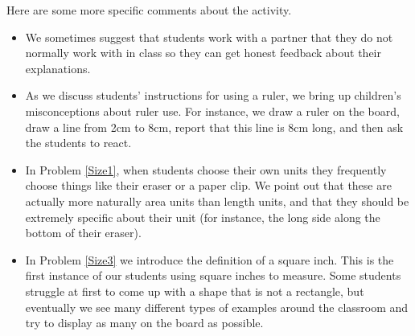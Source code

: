 \documentclass[nooutcomes]{ximera}
\begin{document}
\begin{instructorNotes}
Here are some more specific comments about the activity.
\begin{itemize}
    \item We sometimes suggest that students work with a partner that they do not normally work with in class so they can get honest feedback about their explanations.
    \item As we discuss students' instructions for using a ruler, we bring up children's misconceptions about ruler use.  For instance, we draw a ruler on the board, draw a line from 2cm to 8cm, report that this line is 8cm long, and then ask the students to react.
    \item In Problem \ref{Size1}, when students choose their own units they frequently choose things like their eraser or a paper clip.  We point out that these are actually more naturally area units than length units, and that they should be extremely specific about their unit (for instance, the long side along the bottom of their eraser).
    \item In Problem \ref{Size3} we introduce the definition of a square inch.  This is the first instance of our students using square inches to measure.  Some students struggle at first to come up with a shape that is not a rectangle, but eventually we see many different types of examples around the classroom and try to display as many on the board as possible.
\end{itemize}








\end{instructorNotes}
\end{document}
